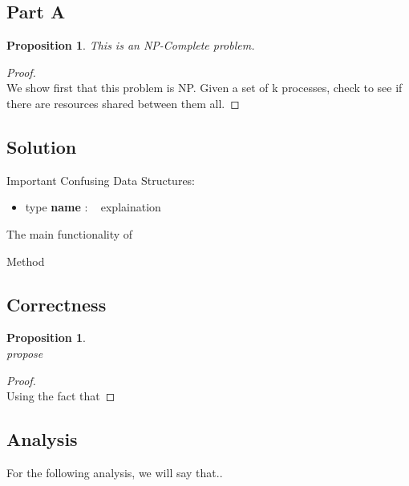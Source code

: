 \documentclass[12pt]{article}
\newtheorem{proposition}[theorem]{Proposition}
\begin{document}
\subsection{Part A}
\begin{proposition}
This is an NP-Complete problem.
\end{proposition}

\begin{proof}
~ \\ \indent We show first that this problem is NP. Given a set of k processes, check
to see if there are resources shared between them all.
\end{proof}


\subsection{Solution}
Important Confusing Data Structures:
\begin{itemize}
    \item type \textbf{name} : ~ explaination
\end{itemize}

The main functionality of 

\begin{algorithm}[H]
\caption{ Method}
\begin{algorithmic}
        
    \EndProcedure
\end{algorithmic}
\end{algorithm}



\subsection{Correctness}
\begin{proposition}
~ \\ \indent propose
\end{proposition}

\begin{proof}
~ \\ \indent Using the fact that 
\end{proof}


\subsection{Analysis}
For the following analysis, we will say that..
\end{document}
